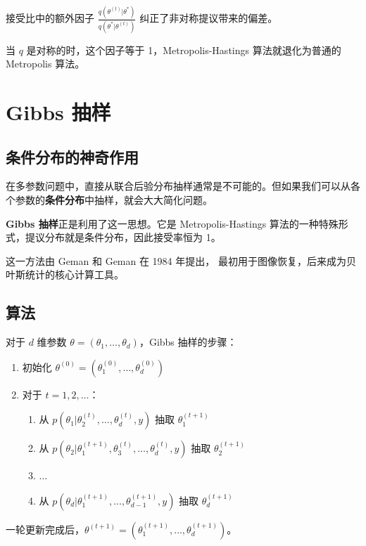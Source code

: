 接受比中的额外因子 $\frac{q(\theta^{(t)} | \theta^*)}{q(\theta^* | \theta^{(t)})}$ 纠正了非对称提议带来的偏差。

当 $q$ 是对称的时，这个因子等于 1，Metropolis-Hastings 算法就退化为普通的 Metropolis 算法。

\section{Gibbs 抽样}

\subsection{条件分布的神奇作用}

在多参数问题中，直接从联合后验分布抽样通常是不可能的。但如果我们可以从各个参数的\textbf{条件分布}中抽样，就会大大简化问题。

\textbf{Gibbs 抽样}正是利用了这一思想。它是 Metropolis-Hastings 算法的一种特殊形式，提议分布就是条件分布，因此接受率恒为 1。

这一方法由 Geman 和 Geman 在 1984 年提出，\cite{geman1984stochastic} 最初用于图像恢复，后来成为贝叶斯统计的核心计算工具。

\subsection{算法}

对于 $d$ 维参数 $\theta = (\theta_1, \ldots, \theta_d)$，Gibbs 抽样的步骤：

\begin{enumerate}
  \item 初始化 $\theta^{(0)} = (\theta_1^{(0)}, \ldots, \theta_d^{(0)})$
  \item 对于 $t = 1, 2, \ldots$：
    \begin{enumerate}
      \item 从 $p(\theta_1 | \theta_2^{(t)}, \ldots, \theta_d^{(t)}, y)$ 抽取 $\theta_1^{(t+1)}$
      \item 从 $p(\theta_2 | \theta_1^{(t+1)}, \theta_3^{(t)}, \ldots, \theta_d^{(t)}, y)$ 抽取 $\theta_2^{(t+1)}$
      \item $\ldots$
      \item 从 $p(\theta_d | \theta_1^{(t+1)}, \ldots, \theta_{d-1}^{(t+1)}, y)$ 抽取 $\theta_d^{(t+1)}$
    \end{enumerate}
\end{enumerate}

一轮更新完成后，$\theta^{(t+1)} = (\theta_1^{(t+1)}, \ldots, \theta_d^{(t+1)})$。

